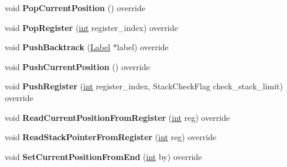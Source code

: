 \begin{DoxyCompactItemize}
void {\bfseries Pop\+Current\+Position} () override
\item 
\mbox{\label{classv8_1_1internal_1_1RegExpMacroAssemblerX64_ac10df1c9a30624ca7152ea52613f7cfd}} 
void {\bfseries Pop\+Register} (\mbox{\hyperlink{classint}{int}} register\+\_\+index) override
\item 
\mbox{\label{classv8_1_1internal_1_1RegExpMacroAssemblerX64_a3d947d69e14f9e66a1bee4ac98a6a73a}} 
void {\bfseries Push\+Backtrack} (\mbox{\hyperlink{classv8_1_1internal_1_1Label}{Label}} $\ast$label) override
\item 
\mbox{\label{classv8_1_1internal_1_1RegExpMacroAssemblerX64_a1603941ac485f3cd50db9f60d7bddbf9}} 
void {\bfseries Push\+Current\+Position} () override
\item 
\mbox{\label{classv8_1_1internal_1_1RegExpMacroAssemblerX64_a9384ade16dc33db095d5a4d3c34965ce}} 
void {\bfseries Push\+Register} (\mbox{\hyperlink{classint}{int}} register\+\_\+index, Stack\+Check\+Flag check\+\_\+stack\+\_\+limit) override
\item 
\mbox{\label{classv8_1_1internal_1_1RegExpMacroAssemblerX64_aaf6790b9d1d6e865f92ffa64fb22b18e}} 
void {\bfseries Read\+Current\+Position\+From\+Register} (\mbox{\hyperlink{classint}{int}} reg) override
\item 
\mbox{\label{classv8_1_1internal_1_1RegExpMacroAssemblerX64_af3d240fde392f1094307b5e864e8f714}} 
void {\bfseries Read\+Stack\+Pointer\+From\+Register} (\mbox{\hyperlink{classint}{int}} reg) override
\item 
\mbox{\label{classv8_1_1internal_1_1RegExpMacroAssemblerX64_a465ac2a5db3e2ab48287768a4ff0ea11}} 
void {\bfseries Set\+Current\+Position\+From\+End} (\mbox{\hyperlink{classint}{int}} by) override
\item 
\mbox{\label{classv8_1_1internal_1_1RegExpMacroAssemblerX64_add7674b26393d16a05a4e7d6db6bb155}} 

\end{DoxyCompactItemize}
